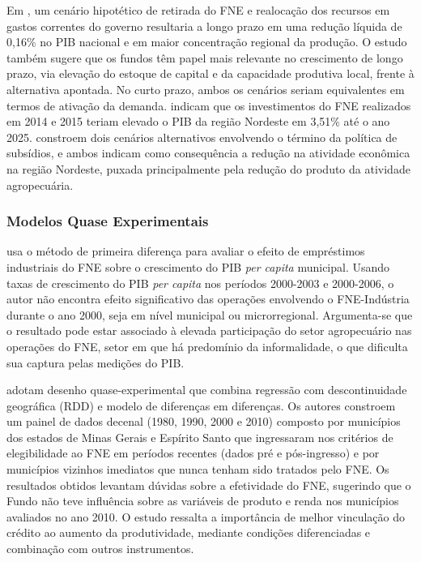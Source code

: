 Em , um cenário hipotético de retirada do FNE e realocação dos recursos em gastos correntes do governo resultaria a longo prazo em uma redução líquida de 0,16\% no PIB nacional e em maior concentração regional da produção. O estudo também sugere que os fundos têm papel mais relevante no crescimento de longo prazo, via elevação do estoque de capital e da capacidade produtiva local, frente à alternativa apontada. No curto prazo, ambos os cenários seriam equivalentes em termos de ativação da demanda.  indicam que os investimentos do FNE realizados em 2014 e 2015 teriam elevado o PIB da região Nordeste em 3,51\% até o ano 2025.  constroem dois cenários alternativos envolvendo o término da política de subsídios, e ambos indicam como consequência a redução na atividade econômica na região Nordeste, puxada principalmente pela redução do produto da atividade agropecuária.

\subsubsection{Modelos Quase Experimentais}

 usa o método de primeira diferença para avaliar o efeito de empréstimos industriais do FNE sobre o crescimento do PIB \textit{per capita} municipal. Usando taxas de crescimento do PIB \textit{per capita} nos períodos 2000-2003 e 2000-2006, o autor não encontra efeito significativo das operações envolvendo o FNE-Indústria durante o ano 2000, seja em nível municipal ou microrregional. Argumenta-se que o resultado pode estar associado à elevada participação do setor agropecuário nas operações do FNE, setor em que há predomínio da informalidade, o que dificulta sua captura pelas medições do PIB.

 adotam desenho quase-experimental que combina regressão com descontinuidade geográfica (RDD) e modelo de diferenças em diferenças. Os autores constroem um painel de dados decenal (1980, 1990, 2000 e 2010) composto por municípios dos estados de Minas Gerais e Espírito Santo que ingressaram nos critérios de elegibilidade ao FNE em períodos recentes (dados pré e pós-ingresso) e por municípios vizinhos imediatos que nunca tenham sido tratados pelo FNE. Os resultados obtidos levantam dúvidas sobre a efetividade do FNE, sugerindo que o Fundo não teve influência sobre as variáveis de produto e renda nos municípios avaliados no ano 2010. O estudo ressalta a importância de melhor vinculação do crédito ao aumento da produtividade, mediante condições diferenciadas e combinação com outros instrumentos.

